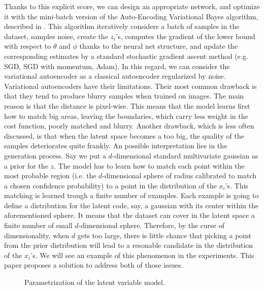 \documentclass[letterpaper, twoside]{article}
\begin{document}
    Thanks to this explicit score, we can design an appropriate network, and optimize it with the mini-batch version of the Auto-Encoding Variational Bayes algorithm, described in \cite{Kingma.aevb}. This algorithm iteratively considers a batch of samples in the dataset, samples noise, create the $z_i$'s,  computes the gradient of the lower bound with respect to $\theta$ and $\phi$ thanks to the neural net structure, and update the corresponding estimates by a standard stochastic gradient ascent method (e.g. SGD, SGD with momentum, Adam). In this regard, we can consider the variational autoencoder as a classical autoencoder regularized by noise. \\

    Variational autoencoders have their limitations. Their most common drawback is that they tend to produce blurry samples when trained on images. The main reason is that the distance is pixel-wise. This means that the model learns first how to match big areas, leaving the boundaries, which carry less weight in the cost function, poorly matched and blurry. Another drawback, which is less often discussed, is that when the latent space becomes a too big, the quality of the samples deteriorates quite frankly. An possible interpretation lies in the generation process. Say we put a $d$-dimensional standard multivariate gaussian as a prior for the $z$. The model has to learn how to match each point within the most probable region (i.e. the $d$-dimensional sphere of radius calibrated to match a chosen confidence probability) to a point in the distribution of the $x_i$'s. This matching is learned trough a finite number of examples. Each example is going to define a distribution for the latent code, say, a gaussian with its center within the aforementioned sphere. It means that the dataset can cover in the latent space a finite number of small $d$-dimensional sphere. Therefore, by the curse of dimensionality, when $d$ gets too large, there is little chance that picking a point from the prior distribution will lead to a resonable candidate in the distribution of the $x_i$'s.
    We will see an example of this phenomenon in the experiments. This paper proposes a solution to address both of those issues.


    \begin{figure}
    \centering
    \caption{Parametrization of the latent variable model.}
    \label{vaegraphmodel}
    \end{figure}
\end{document}
